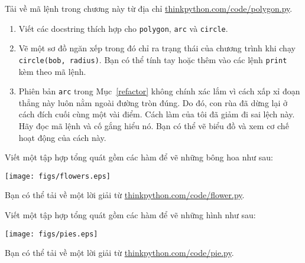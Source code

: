 \documentclass[11pt]{book}
\begin{document}
\begin{ex}

Tải về mã lệnh trong chương này từ địa chỉ 
\url{thinkpython.com/code/polygon.py}.

\begin{enumerate}

\item Viết các docstring thích hợp cho {\tt polygon}, {\tt arc} và 
{\tt circle}.


\item Vẽ một sơ đồ ngăn xếp trong đó chỉ ra trạng thái của chương
trình khi chạy {\tt circle(bob, radius)}.  Bạn có thể tính tay hoặc
thêm vào các lệnh {\tt print} kèm theo mã lệnh.

\item Phiên bản {\tt arc} trong Mục~\ref{refactor} không chính xác
lắm vì cách xấp xỉ đoạn thẳng này luôn nằm ngoài đường tròn đúng.
Do đó, con rùa đã dừng lại ở cách đích cuối cùng một vài điểm. 
Cách làm của tôi đã giảm đi sai lệch này. Hãy đọc mã lệnh và
cố gắng hiểu nó. Bạn có thể vẽ biểu đồ và xem cơ chế hoạt động
của cách này.

\end{enumerate}

\end{ex}


\begin{ex}

Viết một tập hợp tổng quát gồm các hàm để vẽ những bông hoa như sau:

\centerline{\texttt{[image: figs/flowers.eps]}}

Bạn có thể tải về một lời giải từ \url{thinkpython.com/code/flower.py}.

\end{ex}


\begin{ex}

Viết một tập hợp tổng quát gồm các hàm để vẽ những hình như sau:

\centerline{\texttt{[image: figs/pies.eps]}}

Bạn có thể tải về một lời giải từ \url{thinkpython.com/code/pie.py}.

\end{ex}
\end{document}
